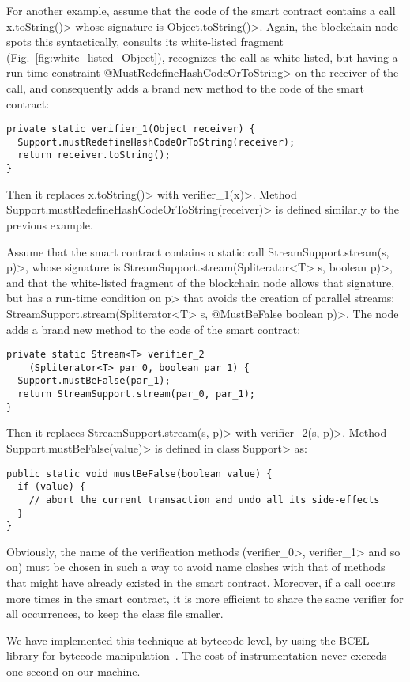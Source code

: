 For another example, assume that the code of the smart contract
contains a call \<x.toString()> whose signature is
\<Object.toString()>.
Again, the blockchain node spots this syntactically,
consults its white-listed fragment (Fig.~\ref{fig:white_listed_Object}),
recognizes the call as
white-listed, but having a run-time constraint \<@MustRedefineHashCodeOrToString> on
the receiver of the call, and consequently
adds a brand new method to the code of the smart contract:
%
\begin{verbatim}
private static verifier_1(Object receiver) {
  Support.mustRedefineHashCodeOrToString(receiver);
  return receiver.toString();
}
\end{verbatim}
%
Then it replaces \<x.toString()> with \<verifier\_1(x)>.
Method \<Support.mustRedefineHashCodeOrToString(receiver)> is defined
similarly to the previous example.

Assume that the smart contract contains a static call
\<StreamSupport.stream(s, p)>, whose signature is
\<StreamSupport.stream(Spliterator$\text{<}$T$\text{>}$ s, boolean p)>,
and that the white-listed fragment of the blockchain node allows that signature,
but has a run-time condition on \<p> that avoids the creation of parallel streams:
\<StreamSupport.stream(Spliterator$\text{<}$T$\text{>}$ s, @MustBeFalse boolean p)>.
The node adds
a brand new method to the code of the smart contract:
%
\begin{verbatim}
private static Stream<T> verifier_2
    (Spliterator<T> par_0, boolean par_1) {
  Support.mustBeFalse(par_1);
  return StreamSupport.stream(par_0, par_1);
}
\end{verbatim}
%
Then it replaces \<StreamSupport.stream(s, p)> with \<verifier\_2(s, p)>.
Method \<Support.mustBeFalse(value)> is defined in class \<Support> as:
%
\begin{verbatim}
public static void mustBeFalse(boolean value) {
  if (value) {
    // abort the current transaction and undo all its side-effects
  }
}
\end{verbatim}

Obviously, the name of the verification methods (\<verifier\_0>, \<verifier\_1> and so on)
must be chosen in such a way to avoid name clashes with that of methods that might
have already existed in the smart contract. Moreover, if a call occurs more times
in the smart contract, it is more efficient to share the same verifier for all
occurrences, to keep the class file smaller.

We have implemented this technique at bytecode level, by using the BCEL
library for bytecode manipulation~\cite{bcel}. The cost of instrumentation never exceeds one
second on our machine.


